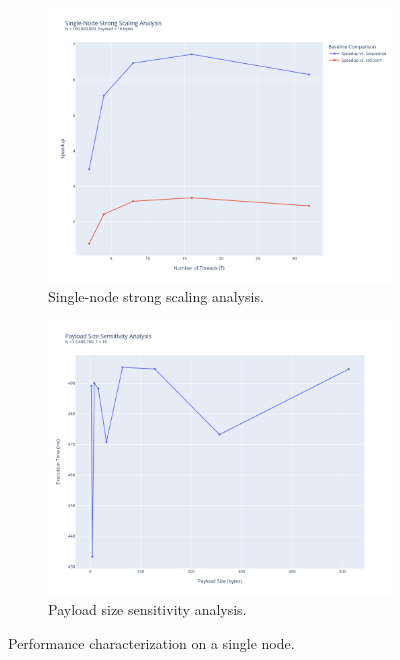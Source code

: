 \documentclass[10pt]{article}
\begin{document}
\begin{figure}[H]
    \centering
    \begin{subfigure}{0.49\textwidth}
        \includegraphics[width=\linewidth]{../python/plots/strong_scaling.pdf}
        \caption{Single-node strong scaling analysis.}
        \label{fig:strong_scaling}
    \end{subfigure}
    \hfill
    \begin{subfigure}{0.49\textwidth}
        \includegraphics[width=\linewidth]{../python/plots/payload_scaling.pdf}
        \caption{Payload size sensitivity analysis.}
        \label{fig:payload_scaling}
    \end{subfigure}
    \caption{Performance characterization on a single node.}
    \label{fig:single_node_analysis}
\end{figure}
\end{document}
